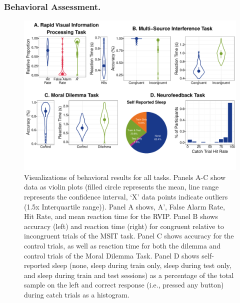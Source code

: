 \subsubsection{Behavioral Assessment.}

\begin{figure}[h!]
   \centering
   \includegraphics[width=.9\textwidth]{bxplots.pdf}
   \caption{Visualizations of behavioral results for all tasks. Panels A-C show data as violin plots (filled circle represents the mean, line range represents the confidence interval, ‘X’ data points indicate outliers (1.5x Interquartile range)). Panel A shows, A’, False Alarm Rate, Hit Rate, and mean reaction time for the RVIP. Panel B shows accuracy (left) and reaction time (right) for congruent relative to incongruent trials of the MSIT task. Panel C shows accuracy for the control trials, as well as reaction time for both the dilemma and control trials of the Moral Dilemma Task. Panel D shows self-reported sleep (none, sleep during train only, sleep during test only, and sleep during train and test sessions) as a percentage of the total sample on the left and correct response (i.e., pressed any button) during catch trials as a histogram.}
   \label{fig:bx_plots}
\end{figure}

